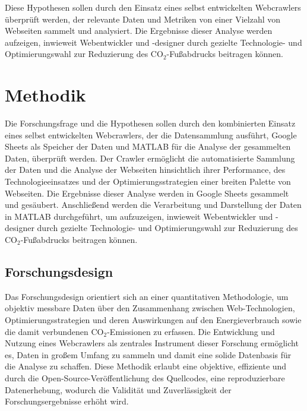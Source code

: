\documentclass[Bachelor,BIF,german,IEEE]{BASE/twbook}
\begin{document}
\noindent Diese Hypothesen sollen durch den Einsatz eines selbst entwickelten Webcrawlers überprüft werden, der relevante Daten und Metriken von einer Vielzahl von Webseiten sammelt und analysiert. Die Ergebnisse dieser Analyse werden aufzeigen, inwieweit Webentwickler und -designer durch gezielte Technologie- und Optimierungswahl zur Reduzierung des CO$_2$-Fußabdrucks beitragen können.

\clearpage   


\chapter{Methodik}

\noindent Die Forschungsfrage und die Hypothesen sollen durch den kombinierten Einsatz eines selbst entwickelten Webcrawlers, der die Datensammlung ausführt, Google Sheets als Speicher der Daten und MATLAB für die Analyse der gesammelten Daten, überprüft werden. Der Crawler ermöglicht die automatisierte Sammlung der Daten und die Analyse der Webseiten hinsichtlich ihrer Performance, des Technologieeinsatzes und der Optimierungsstrategien einer breiten Palette von Webseiten. Die Ergebnisse dieser Analyse werden in Google Sheets gesammelt und gesäubert. Anschließend werden die Verarbeitung und Darstellung der Daten in MATLAB durchgeführt, um aufzuzeigen, inwieweit Webentwickler und -designer durch gezielte Technologie- und Optimierungswahl zur Reduzierung des CO$_2$-Fußabdrucks beitragen können.

\section{Forschungsdesign}
Das Forschungsdesign orientiert sich an einer quantitativen Methodologie, um objektiv messbare Daten über den Zusammenhang zwischen Web-Technologien, Optimierungsstrategien und deren Auswirkungen auf den Energieverbrauch sowie die damit verbundenen CO$_2$-Emissionen zu erfassen. Die Entwicklung und Nutzung eines Webcrawlers als zentrales Instrument dieser Forschung ermöglicht es, Daten in großem Umfang zu sammeln und damit eine solide Datenbasis für die Analyse zu schaffen. Diese Methodik erlaubt eine objektive, effiziente und durch die Open-Source-Veröffentlichung des Quellcodes, eine reproduzierbare Datenerhebung, wodurch die Validität und Zuverlässigkeit der Forschungsergebnisse erhöht wird.
\end{document}
